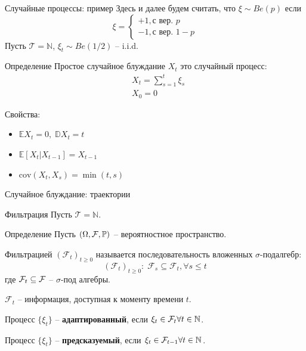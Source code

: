 \documentclass{beamer}
\begin{document}
\begin{frame}{Случайные процессы: пример}
Здесь и далее будем считать, что $\xi \sim Be(p)$ если
    $$
        \xi = \begin{cases}
            +1, \text{с вер. } p\\
            -1, \text{с вер. } 1-p
        \end{cases}
    $$
    Пусть $\mathcal{T}=\mathbb{N}$, $\xi_t \sim Be(1/2)$ -- i.i.d.
    \begin{block}{Определение}
        Простое случайное блуждание $X_t$ это случайный процесс:
        \begin{align*}
            & X_t = \sum_{s=1}^{t} \xi_s \\
            & X_0 = 0
        \end{align*}            
    \end{block}
    Свойства:
    \begin{itemize}
        \item $\mathbb{E} X_t = 0, \; \mathbb{D} X_t = t$
        \item $\mathbb{E} \left[ X_t | X_{t-1} \right] = X_{t-1}$
        \item $\mathrm{cov}(X_t, X_s) = \min(t, s)$
    \end{itemize}
\end{frame}

\begin{frame}{Случайное блуждание: траектории}
    \noindent{}
\end{frame}
\begin{frame}{Фильтрация}
    Пусть $\mathcal{T} = \mathbb{N}$.
    \begin{block}{Определение}
        Пусть \((\Omega, \mathcal{F}, \mathbb{P})\) -- вероятностное пространство.
        
        Фильтрацией $(\mathcal{F}_t)_{t \geq 0}$ называется последовательность вложенных $\sigma$-подалгебр:
        $$
            (\mathcal{F}_t)_{t \geq 0}: \; \mathcal{F}_s \subseteq \mathcal{F}_t, \forall s\leq t
        $$
        где $\mathcal{F}_t \subseteq \mathcal{F}$ -- $\sigma$-под алгебры.   
    \end{block}

    $\mathcal{F}_t$ -- информация, доступная к моменту времени $t$.

    Процесс $\{\xi_t\}$ -- \textbf{адаптированный}, если $\xi_t \in \mathcal{F}_t \forall t \in \mathbb{N}$.

    Процесс $\{\xi_t\}$ -- \textbf{предсказуемый}, если $\xi_t \in \mathcal{F}_{t-1} \forall t \in \mathbb{N}$.
\end{frame}
\end{document}
